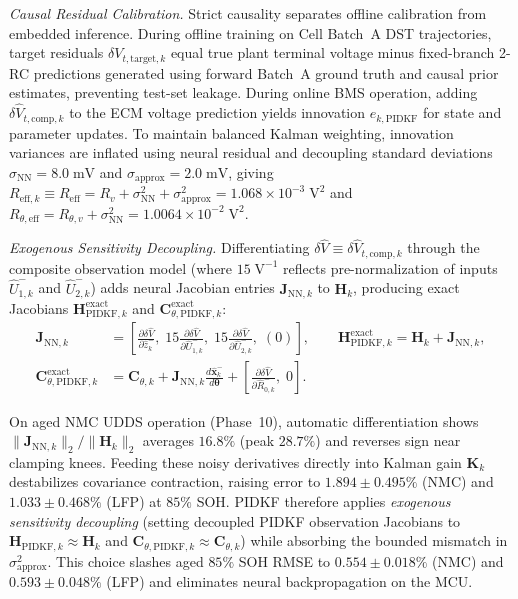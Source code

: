 \documentclass[10pt,a4paper]{article}
\begin{document}
\emph{Causal Residual Calibration.} Strict causality separates offline calibration from embedded inference. During offline training on Cell Batch~A DST trajectories, target residuals $\delta V_{t,\text{target},k}$ equal true plant terminal voltage minus fixed-branch 2-RC predictions generated using forward Batch~A ground truth and causal prior estimates, preventing test-set leakage. During online BMS operation, adding $\delta\hat{V}_{t,\text{comp},k}$ to the ECM voltage prediction yields innovation $e_{k,\text{PIDKF}}$ for state and parameter updates. To maintain balanced Kalman weighting, innovation variances are inflated using neural residual and decoupling standard deviations $\sigma_{\text{NN}} = 8.0\;\mathrm{mV}$ and $\sigma_{\text{approx}} = 2.0\;\mathrm{mV}$, giving $R_{\text{eff},k} \equiv R_{\text{eff}} = R_v + \sigma_{\text{NN}}^2 + \sigma_{\text{approx}}^2 = 1.068 \times 10^{-3}\;\mathrm{V}^2$ and $R_{\theta,\text{eff}} = R_{\theta,v} + \sigma_{\text{NN}}^2 = 1.0064 \times 10^{-2}\;\mathrm{V}^2$.

\emph{Exogenous Sensitivity Decoupling.} Differentiating $\delta\hat{V} \equiv \delta\hat{V}_{t,\text{comp},k}$ through the composite observation model (where $15\;\mathrm{V}^{-1}$ reflects pre-normalization of inputs $\hat{U}_{1,k}^-$ and $\hat{U}_{2,k}^-$) adds neural Jacobian entries $\mathbf{J}_{\text{NN},k}$ to $\mathbf{H}_k$, producing exact Jacobians $\mathbf{H}_{\text{PIDKF},k}^{\text{exact}}$ and $\mathbf{C}_{\theta,\text{PIDKF},k}^{\text{exact}}$:
\begin{align*}
\mathbf{J}_{\text{NN},k} &= \left[\frac{\partial\delta\hat{V}}{\partial\hat{z}_k^-},\; 15\frac{\partial\delta\hat{V}}{\partial\hat{U}_{1,k}^-},\; 15\frac{\partial\delta\hat{V}}{\partial\hat{U}_{2,k}^-},\; (0)\right], \qquad
\mathbf{H}_{\text{PIDKF},k}^{\text{exact}} = \mathbf{H}_k + \mathbf{J}_{\text{NN},k}, \\
\mathbf{C}_{\theta,\text{PIDKF},k}^{\text{exact}} &= \mathbf{C}_{\theta,k} + \mathbf{J}_{\text{NN},k}\frac{d\hat{\mathbf{x}}_k^-}{d\boldsymbol{\theta}} + \left[\frac{\partial \delta\hat{V}}{\partial \hat{R}_{0,k}^-},\; 0\right].
\end{align*}
{\sloppy On aged NMC UDDS operation (Phase~10), automatic differentiation shows $\|\mathbf{J}_{\text{NN},k}\|_2 / \|\mathbf{H}_k\|_2$ averages $16.8\%$ (peak $28.7\%$) and reverses sign near clamping knees. Feeding these noisy derivatives directly into Kalman gain $\mathbf{K}_k$ destabilizes covariance contraction, raising error to $1.894\pm0.495\%$ (NMC) and $1.033\pm0.468\%$ (LFP) at $85\%$ SOH. PIDKF therefore applies \emph{exogenous sensitivity decoupling} (setting decoupled PIDKF observation Jacobians to $\mathbf{H}_{\text{PIDKF},k} \approx \mathbf{H}_k$ and $\mathbf{C}_{\theta,\text{PIDKF},k} \approx \mathbf{C}_{\theta,k}$) while absorbing the bounded mismatch in $\sigma_{\text{approx}}^2$. This choice slashes aged $85\%$ SOH RMSE to $0.554\pm0.018\%$ (NMC) and $0.593\pm0.048\%$ (LFP) and eliminates neural backpropagation on the MCU.\par}
\end{document}
